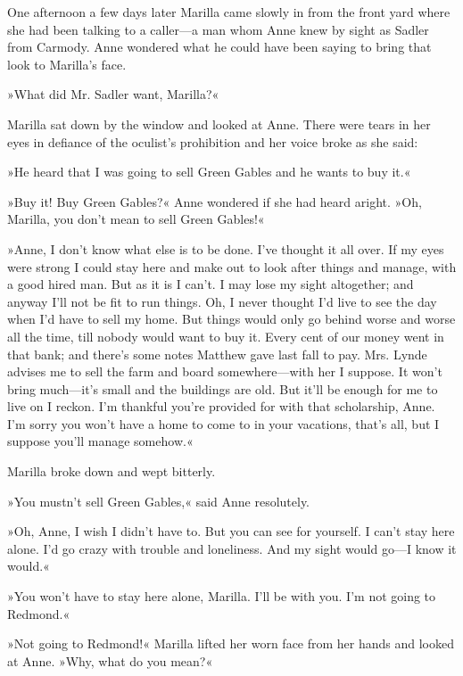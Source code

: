 One afternoon a few days later Marilla came slowly in from the front yard where she had been talking to a caller—a man whom Anne knew by sight as Sadler from Carmody. Anne wondered what he could have been saying to bring that look to Marilla's face.

»What did Mr. Sadler want, Marilla?«

Marilla sat down by the window and looked at Anne. There were tears in her eyes in defiance of the oculist's prohibition and her voice broke as she said:

»He heard that I was going to sell Green Gables and he wants to buy it.«

»Buy it! Buy Green Gables?« Anne wondered if she had heard aright. »Oh, Marilla, you don't mean to sell Green Gables!«

»Anne, I don't know what else is to be done. I've thought it all over. If my eyes were strong I could stay here and make out to look after things and manage, with a good hired man. But as it is I can't. I may lose my sight altogether; and anyway I'll not be fit to run things. Oh, I never thought I'd live to see the day when I'd have to sell my home. But things would only go behind worse and worse all the time, till nobody would want to buy it. Every cent of our money went in that bank; and there's some notes Matthew gave last fall to pay. Mrs. Lynde advises me to sell the farm and board somewhere—with her I suppose. It won't bring much—it's small and the buildings are old. But it'll be enough for me to live on I reckon. I'm thankful you're provided for with that scholarship, Anne. I'm sorry you won't have a home to come to in your vacations, that's all, but I suppose you'll manage somehow.«

Marilla broke down and wept bitterly.

»You mustn't sell Green Gables,« said Anne resolutely.

»Oh, Anne, I wish I didn't have to. But you can see for yourself. I can't stay here alone. I'd go crazy with trouble and loneliness. And my sight would go—I know it would.«

»You won't have to stay here alone, Marilla. I'll be with you. I'm not going to Redmond.«

»Not going to Redmond!« Marilla lifted her worn face from her hands and looked at Anne. »Why, what do you mean?«

